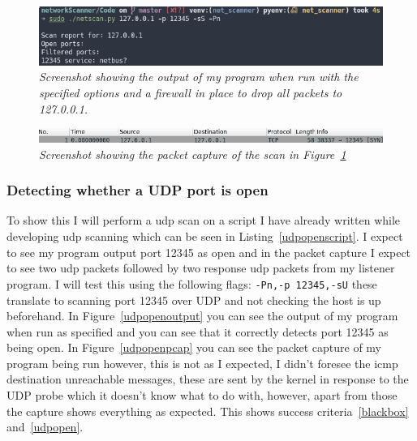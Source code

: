 \documentclass[titlepage]{article}
\let\Oldsubsubsection\subsubsection{}
\renewcommand{\subsubsection}{\FloatBarrier\Oldsubsubsection}
\begin{document}
\begin{figure}[H]
  \centering
  \includegraphics[width=\textwidth]{tcpfilteredoutput.png}
  \caption{\textit{%
    Screenshot showing the output of my program when run with the specified options
    and a firewall in place to drop all packets to 127.0.0.1.
}}\label{tcpfilteredoutput}
\end{figure}

\begin{figure}[H]
  \centering
  \includegraphics[width=\textwidth]{tcpfilteredpcap.png}
  \caption{\textit{%
    Screenshot showing the packet capture of the scan in Figure~\ref{tcpfilteredoutput}
}}\label{tcpfilteredpcap}
\end{figure}

\subsubsection{Detecting whether a UDP port is open}
To show this I will perform a \gls{udp} scan on a script I have already written while
developing \gls{udp} scanning which can be seen in Listing~\ref{udpopenscript}.
I expect to see my program output port 12345 as open and in the packet capture I
expect to see two \gls{udp} packets followed by two response \gls{udp} packets from my
listener program. I will test this using the following flags: \verb|-Pn,-p 12345,-sU|
these translate to scanning port 12345 over UDP and not checking the host is up beforehand.
In Figure~\ref{udpopenoutput} you can see the output of my program when run as specified
and you can see that it correctly detects port 12345 as being open.
In Figure~\ref{udpopenpcap} you can see the packet capture of my program being run
however, this is not as I expected, I didn't foresee the \gls{icmp} destination unreachable
messages, these are sent by the kernel in response to the UDP probe which it doesn't know what
to do with, however, apart from those the capture shows everything as expected.
This shows success criteria~\ref{blackbox} and~\ref{udpopen}.


\end{document}
